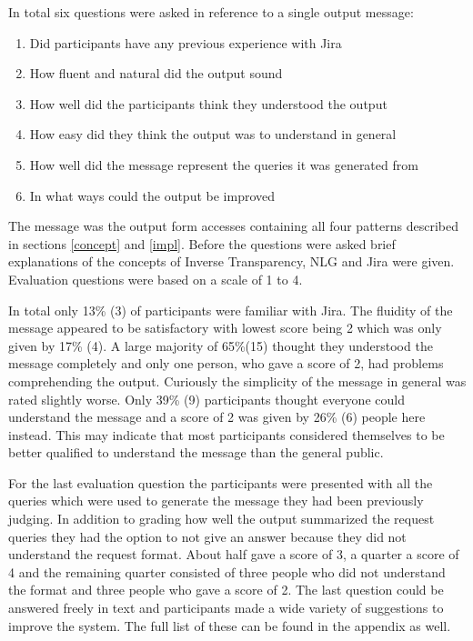 \documentclass[sigconf,obeyspaces]{acmart}
\begin{document}
In total six questions were asked in reference to a single output message:
\begin{enumerate}
    \item Did participants have any previous experience with Jira
    \item How fluent and natural did the output sound
    \item How well did the participants think they understood the output
    \item How easy did they think the output was to understand in general
    \item How well did the message represent the queries it was generated from
    \item In what ways could the output be improved
\end{enumerate}
The message was the output form accesses containing all four patterns described in sections \ref{concept} and \ref{impl}. Before the questions were asked brief explanations of the concepts of Inverse Transparency, NLG and Jira were given. Evaluation questions were based on a scale of 1 to 4.

In total only 13\% (3) of participants were familiar with Jira. The fluidity of the message appeared to be satisfactory with lowest score being 2 which was only given by 17\% (4). A large majority of 65\%(15) thought they understood the message completely and only one person, who gave a score of 2, had problems comprehending the output. Curiously the simplicity of the message in general was rated slightly worse. Only 39\% (9) participants thought everyone could understand the message and a score of 2 was given by 26\% (6) people here instead. This may indicate that most participants considered themselves to be better qualified to understand the message than the general public.

For the last evaluation question the participants were presented with all the queries which were used to generate the message they had been previously judging. In addition to grading how well the output summarized the request queries they had the option to not give an answer because they did not understand the request format. About half gave a score of 3, a quarter a score of 4 and the remaining quarter consisted of three people who did not understand the format and three people who gave a score of 2. The last question could be answered freely in text and participants made a wide variety of suggestions to improve the system. The full list of these can be found in the appendix as well.
\end{document}
